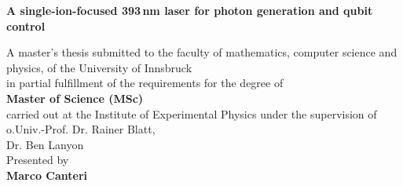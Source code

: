 
\begin{titlepage}


 \thispagestyle{frontpage}

 \begin{center}

   \vspace*{6\baselineskip}


   {\Huge \textbf{A single-ion-focused 393$\,$nm laser for photon generation and qubit control\\}}



       \vspace*{1,5\baselineskip}


   \vspace{1,5\baselineskip}

   \large{A master’s thesis submitted to the faculty of mathematics, computer science and physics, of the University of Innsbruck\\ in partial fulfillment of the requirements for the degree of\\\vspace{1,2\baselineskip}\textbf{Master of Science (MSc)} \\\vspace{1,2\baselineskip}carried out at the Institute of Experimental Physics under the supervision of}\\
   \large{o.Univ.-Prof.  Dr.  Rainer Blatt,}\\
   \large{Dr. Ben Lanyon}\\
    \vspace{1,2\baselineskip}
   \large{Presented by\\}
   \huge{\textbf{Marco Canteri}}\\
   \vfill
   \large{ }

 \end{center}

\end{titlepage}
